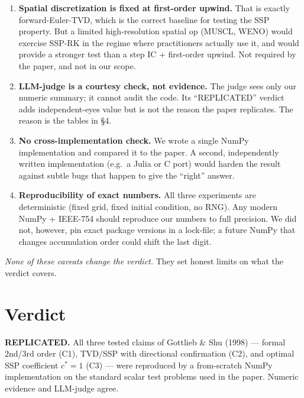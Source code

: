 \documentclass[11pt]{article}
\begin{document}
\begin{enumerate}
\item \textbf{Spatial discretization is fixed at first-order upwind.} That
is exactly forward-Euler-TVD, which is the correct baseline for testing
the SSP property. But a limited high-resolution spatial op (MUSCL, WENO)
would exercise SSP-RK in the regime where practitioners actually use it,
and would provide a stronger test than a step IC + first-order upwind.
Not required by the paper, and not in our scope.

\item \textbf{LLM-judge is a courtesy check, not evidence.} The judge sees
only our numeric summary; it cannot audit the code. Its ``REPLICATED''
verdict adds independent-eyes value but is not the reason the paper
replicates. The reason is the tables in \S4.

\item \textbf{No cross-implementation check.} We wrote a single NumPy
implementation and compared it to the paper. A second, independently
written implementation (e.g.\ a Julia or C port) would harden the result
against subtle bugs that happen to give the ``right'' answer.

\item \textbf{Reproducibility of exact numbers.} All three experiments are
deterministic (fixed grid, fixed initial condition, no RNG). Any modern
NumPy + IEEE-754 should reproduce our numbers to full precision. We did
not, however, pin exact package versions in a lock-file; a future NumPy
that changes accumulation order could shift the last digit.

\end{enumerate}

\emph{None of these caveats change the verdict.} They set honest limits on
what the verdict covers.

\section{Verdict}

\textbf{REPLICATED.} All three tested claims of Gottlieb \& Shu (1998) ---
formal 2nd/3rd order (C1), TVD/SSP with directional confirmation (C2), and
optimal SSP coefficient $c^{\ast} = 1$ (C3) --- were reproduced by a
from-scratch NumPy implementation on the standard scalar test problems
used in the paper. Numeric evidence and LLM-judge agree.
\end{document}

